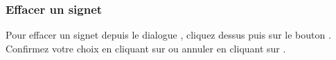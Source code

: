 
\subsubsection{Effacer un signet}
Pour effacer un signet depuis le dialogue , cliquez dessus puis sur le bouton .
Confirmez votre choix en cliquant sur  ou annuler en cliquant sur .

